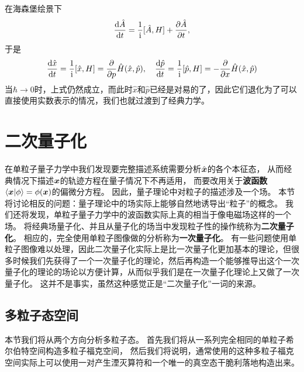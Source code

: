 \documentclass[hyperref, UTF8, a4paper]{ctexart}
\newcommand*{\ii}{\mathrm{i}}
\begin{document}
在海森堡绘景下
\[
    \dv{\hat{A}}{t} = \frac{1}{\ii} [\hat{A}, H] + \pdv{\hat{A}}{t},
\]
于是
\[
    \dv{\hat{x}}{t} = \frac{1}{\ii} [\hat{x}, H] = \pdv{p} \hat{H}(\hat{x}, \hat{p}), \quad
    \dv{\hat{p}}{t} = \frac{1}{\ii} [\hat{p}, H] = -\pdv{x} \hat{H}(\hat{x}, \hat{p})
\]
当$\hbar \to 0$时，上式仍然成立，而此时$\hat{x}$和$\hat{p}$已经是对易的了，因此它们退化为了可以直接使用实数表示的情况，我们也就过渡到了经典力学。

\section{二次量子化}\label{sec:second-quantization}

在单粒子量子力学中我们发现要完整描述系统需要分析$\hat{\vb*{x}}$的各个本征态，
从而经典情况下描述$\vb*{x}$的轨迹方程在量子情况下不再适用，
而要改用关于\textbf{波函数}$\braket{\vb*{x}}{\phi} = \phi(\vb*{x})$的偏微分方程。
因此，量子理论中对粒子的描述涉及一个场。
本节将讨论相反的问题：量子理论中的场实际上能够自然地诱导出“粒子”的概念。
我们还将发现，单粒子量子力学中的波函数实际上真的相当于像电磁场这样的一个场。
将经典场量子化、并且从量子化的场当中发现粒子性的操作统称为\textbf{二次量子化}。
相应的，完全使用单粒子图像做的分析称为\textbf{一次量子化}。
有一些问题使用单粒子图像难以处理，因此二次量子化实际上是比一次量子化更加基本的理论，但很多时候我们先获得了一个一次量子化的理论，然后再构造一个能够推导出这个一次量子化的理论的场论以方便计算，从而似乎我们是在一次量子化理论上又做了一次量子化。
这并不是事实，虽然这种感觉正是“二次量子化”一词的来源。

\subsection{多粒子态空间}\label{sec:many-body-state}

本节我们将从两个方向分析多粒子态。
首先我们将从一系列完全相同的单粒子希尔伯特空间构造多粒子福克空间，
然后我们将说明，通常使用的这种多粒子福克空间实际上可以使用一对产生湮灭算符和一个唯一的真空态干脆利落地构造出来。
\end{document}
